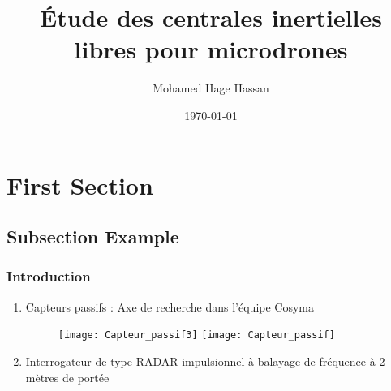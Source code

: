 \documentclass{beamer}
\title[Stage L3 FEMTO-ST]{\'Etude des centrales inertielles libres pour microdrones } %
\author{Mohamed Hage Hassan} %
\institute[UFC] %
{
Universit\'e de Franche-Comt\'e \\ %
\medskip
\textit{mohamed.hagehassan@femto-st.fr} %
}
\date{\today} %
\begin{document}
\begin{frame}
\titlepage %
\end{frame}


\section{First Section} %

\subsection{Subsection Example} %


\begin{frame}
\frametitle{Introduction}

\begin{enumerate}
\item Capteurs passifs : Axe de recherche dans l'\'equipe Cosyma

\begin{figure}
\texttt{[image: Capteur\_passif3]}
\texttt{[image: Capteur\_passif]}

\end{figure}


\item Interrogateur de type RADAR impulsionnel \`a balayage de fr\'equence \`a 2 m\`etres de port\'ee
\end{enumerate}

\end{frame}

\end{document}
